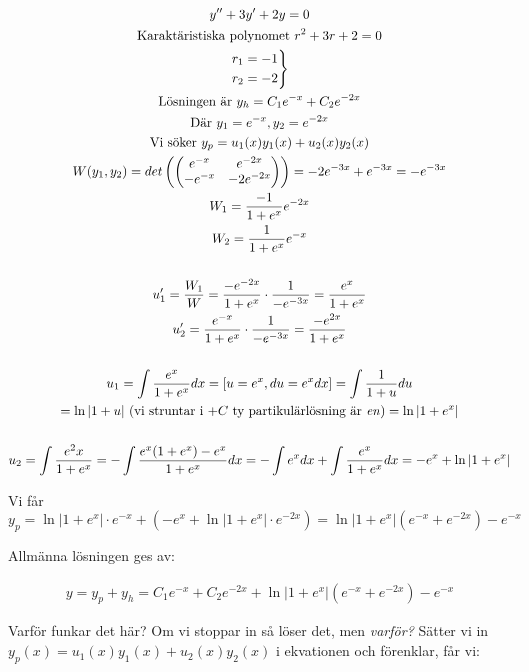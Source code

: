 \begin{equation*}
  \begin{gathered}
    y^{\prime\prime}+3y^{\prime}+2y=0\\
    \text{Karaktäristiska polynomet } r^2+3r+2=0\\
    \begin{rcases*}
      r_1 = -1\\
      r_2 = -2
    \end{rcases*}\\
    \text{Lösningen är } y_h = C_1e^{-x}+C_2e^{-2x}\\
    \text{Där } y_1 = e^{-x}, y_2 = e^{-2x}\\
    \text{Vi söker } y_p = u_1(x)y_1(x)+u_2(x)y_2(x)\\
    W(y_1,y_2) = det\left(\begin{pmatrix}e^{-x}&e^{-2x}\\-e^{-x}&-2e^{-2x}\end{pmatrix}\right) = -2e^{-3x}+e^{-3x} = -e^{-3x}\\
    W_1 = \dfrac{-1}{1+e^x}e^{-2x}\\
    W_2 = \dfrac{1}{1+e^x}e^{-x}\\\\
    u_1^{\prime} = \dfrac{W_1}{W} = \dfrac{-e^{-2x}}{1+e^x}\cdot\dfrac{1}{-e^{-3x}} = \dfrac{e^x}{1+e^x}\\
    u_2^{\prime} = \dfrac{e^{-x}}{1+e^x}\cdot\dfrac{1}{-e^{-3x}}=\dfrac{-e^{2x}}{1+e^x}\\\\
    u_1 = \int\dfrac{e^x}{1+e^x}dx = \left[u = e^x, du = e^xdx\right] = \int\dfrac{1}{1+u}du\\
    = \ln|1+u| \text{ (vi struntar i +$C$ ty partikulärlösning är \textit{en})} = \ln\left|1+e^x\right|\\\\
    u_2 = \int \dfrac{e^2x}{1+e^x} = -\int\dfrac{e^x(1+e^x)-e^x}{1+e^x}dx = -\int e^xdx+\int\dfrac{e^x}{1+e^x}dx = -e^x+\ln\left|1+e^x\right|
  \end{gathered}
\end{equation*}
\par\bigskip
\noindent Vi får $y_p = \ln\left|1+e^x\right|\cdot e^{-x} + (-e^x+\ln\left|1+e^x\right|\cdot e^{-2x}) = \ln\left|1+e^x\right|(e^{-x}+e^{-2x})-e^{-x}$
\par\bigskip
\noindent Allmänna lösningen ges av:

\begin{equation*}
  \begin{gathered}
    y = y_p+y_h = C_1e^{-x}+C_2e^{-2x}+\ln\left|1+e^x\right|(e^{-x}+e^{-2x})-e^{-x}
  \end{gathered}
\end{equation*}
\par\bigskip
\noindent Varför funkar det här? Om vi stoppar in så löser det, men \textit{varför?} Sätter vi in $y_p(x)=u_1(x)y_1(x)+u_2(x)y_2(x)$ i ekvationen och förenklar, får vi:

